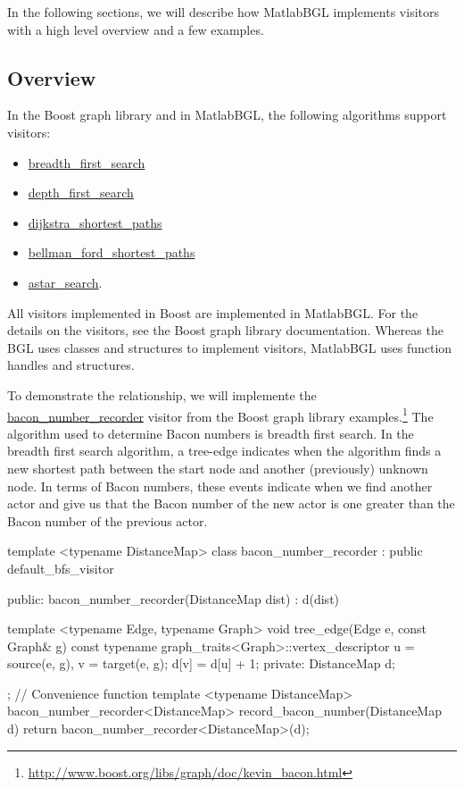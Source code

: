 \documentclass[12pt]{article}
\newcommand{\mycmd}[1]{\url{#1}}
\begin{document}
In the following sections, we will describe how MatlabBGL implements visitors with a high level overview and a few examples.  

\subsection{Overview} In the Boost graph library and in MatlabBGL, the following algorithms support visitors:
\begin{itemize}
\item \mycmd{breadth_first_search}
\item \mycmd{depth_first_search}
\item \mycmd{dijkstra_shortest_paths}
\item \mycmd{bellman_ford_shortest_paths}
\item \mycmd{astar_search}.
\end{itemize}
All visitors implemented in Boost are implemented in MatlabBGL.  For the details on the visitors, see the Boost graph library documentation.  Whereas the BGL uses classes and structures to implement visitors, MatlabBGL uses function handles and structures.  

To demonstrate the relationship, we will implemente the \mycmd{bacon_number_recorder} visitor from the Boost graph library examples.\footnote{\url{http://www.boost.org/libs/graph/doc/kevin_bacon.html}}
The algorithm used to determine Bacon numbers is breadth first search.  In the breadth first search algorithm, a tree-edge indicates when the algorithm finds a new shortest path between the start node and another (previously) unknown node.  In terms of Bacon numbers, these events indicate when we find another actor and give us that the Bacon number of the new actor is one greater than the Bacon number of the previous actor.

\begin{mcode}
  template <typename DistanceMap>
  class bacon_number_recorder : public default_bfs_visitor
  {
  public:
    bacon_number_recorder(DistanceMap dist) : d(dist) { }

    template <typename Edge, typename Graph>
    void tree_edge(Edge e, const Graph& g) const
    {
      typename graph_traits<Graph>::vertex_descriptor
	u = source(e, g), v = target(e, g);
	d[v] = d[u] + 1;
    }
  private:
      DistanceMap d;
  };
  // Convenience function
  template <typename DistanceMap>
  bacon_number_recorder<DistanceMap>
  record_bacon_number(DistanceMap d)
  {
    return bacon_number_recorder<DistanceMap>(d);
  }
\end{mcode}
\end{document}
